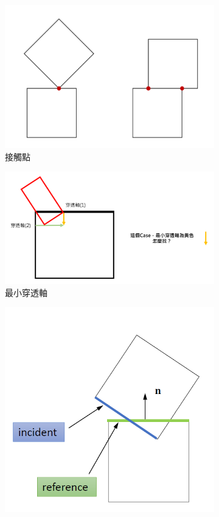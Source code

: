 \begin{figure}[h]
    \begin{subfigure}[b]{0.24\linewidth}
    \includegraphics[width=0.8\linewidth]{./resources/physics/contactPoint(2).png}
    \caption{接觸點}
    \end{subfigure}
    \begin{subfigure}[b]{0.24\linewidth}
    \includegraphics[width=0.8\linewidth]{./resources/physics/miniAxis.png}
    \caption{最小穿透軸}
    \end{subfigure}
    \begin{subfigure}[b]{0.24\linewidth}
    \includegraphics[width=0.8\linewidth]{./resources/physics/refinc.png}

\end{subfigure}
\end{figure}
